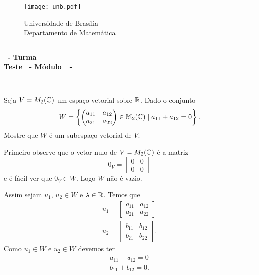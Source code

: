\documentclass[12pt]{exam}
\begin{document}
    \begin{figure}[h]
        \begin{minipage}[c]{1.7cm}
            \texttt{[image: unb.pdf]}
        \end{minipage}
        \hspace{0pt}
        \begin{minipage}[c]{4in}
            {Universidade de Brasília} \\
            {Departamento de Matemática}
        \end{minipage}
    \end{figure}
    \hrule
    \begin{center}
        {\Large\bf \disciplina\ - Turma \turma}  \\
         {\large\bf Teste \numeroteste\ - Módulo\ \modulo\ -\ \dataavaliacao}
    \end{center}

    \\
    \vspace*{.01cm}

    \vspace{.4cm}

    \questao{} Seja $V = M_2(\mathbb{C})$ um espaço vetorial sobre $\mathbb{R}$. Dado o conjunto
    \[
        W = \left\{\begin{pmatrix} a_{11} & a_{12}\\ a_{21} & a_{22}\end{pmatrix} \in \mathbb{M}_2(\mathbb{C}) \mid a_{11} + a_{12} = 0\right\}.
    \]
    Mostre que $W$ é um subespaço vetorial de $V$.

    \solucao
    Primeiro observe que o vetor nulo de $V = M_2(\mathbb{C})$ é a matriz
    \[
        0_V = \begin{bmatrix}
            0 & 0\\0 & 0
        \end{bmatrix}
    \]
    e é fácil ver que $0_V \in W$. Logo $W$ não é vazio.

    Assim sejam $u_1$, $u_2 \in W$ e $\lambda \in \mathbb{R}$. Temos que
    \begin{align*}
        u_1 = \begin{bmatrix}
            a_{11} & a_{12}\\a_{21} & a_{22}
        \end{bmatrix}\\
        u_2 = \begin{bmatrix}
            b_{11} & b_{12}\\b_{21} & b_{22}
        \end{bmatrix}.
    \end{align*}
    Como $u_1 \in W$ e $u_2 \in W$ devemos ter
    \begin{align*}
        a_{11} + a_{12} = 0\\
        b_{11} + b_{12} = 0.
    \end{align*}
\end{document}
